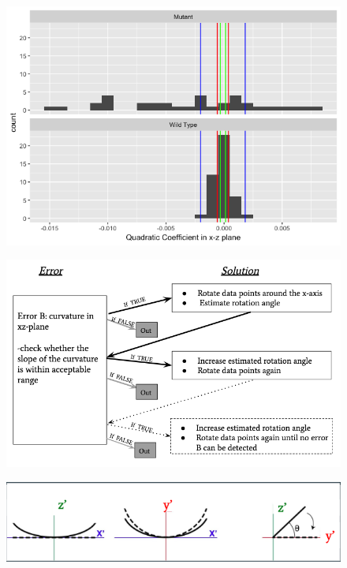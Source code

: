 \documentclass[10pt,letterpaper]{article}
\begin{document}
\begin{figure}[H]
\includegraphics[width=0.9\linewidth]{visualization_paper/range_for_is_errorB} \end{figure}

\begin{figure}[H]
\includegraphics[width=0.9\linewidth]{visualization_paper/diagram_2errors} \end{figure}

\begin{figure}[H]
\includegraphics[width=0.9\linewidth]{visualization_paper/error_correctionB} \end{figure}
\end{document}
